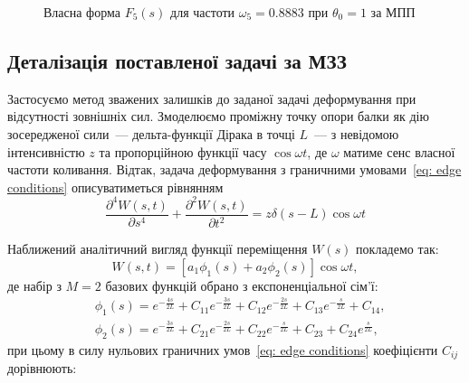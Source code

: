 \begin{figure}[H]\centering
    \resizebox{\linewidth}{!}{}
    \caption{Власна форма $F_5(s)$ для частоти $\omega_5 = 0.8883$ при $\theta_0=1$ за МПП}
    \label{pic: TMM F5(s) eigenvector}
\end{figure}


\subsection*{Деталізація поставленої задачі за МЗЗ}
\label{section: WRM detalization}

Застосуємо метод зважених залишків до заданої задачі деформування при відсутності зовнішніх сил. Змоделюємо проміжну точку опори балки як дію зосередженої сили~--- дельта-функції Дірака в точці $L$~--- з невідомою інтенсивністю $z$ та пропорційною функції часу $\cos{\omega t}$, де $\omega$ матиме сенс власної частоти коливання. Відтак, задача деформування з граничними умовами~\eqref{eq: edge conditions} описуватиметься рівнянням
\begin{equation}\label{eq: homogeneous d.e. WRM}
    \frac{\partial^4 W(s,t)}{\partial s^4} + \frac{\partial^2 W(s,t)}{\partial t^2} =  z\delta(s-L)\cos{\omega t}
\end{equation}

Наближений аналітичний вигляд функції переміщення $W(s)$ покладемо так:
\begin{equation}\label{eq: W(s) M=2 approximation}
    W(s,t) = \left[ a_1\phi_1(s) + a_2\phi_2(s) \right] \cos{\omega t},
\end{equation}
де набір з $M=2$ базових функцій обрано з експоненціальної сім'ї:
\begin{align}
    & \phi_1(s) = e^{-\frac{4s}{2L}} + C_{11}e^{-\frac{3s}{2L}} + C_{12}e^{-\frac{2s}{2L}} + C_{13}e^{-\frac{s}{2L}} + C_{14}, \label{eq: M=2 trial phi1(x)} \\
    & \phi_2(s) = e^{-\frac{3s}{2L}} + C_{21}e^{-\frac{2s}{2L}} + C_{22}e^{-\frac{s}{2L}} + C_{23} + C_{24}e^{\frac{s}{2L}} \label{eq:  M=2 trial phi2(x)},
\end{align}
при цьому в силу нульових граничних умов~\eqref{eq: edge conditions} коефіцієнти $C_{ij}$ дорівнюють:

